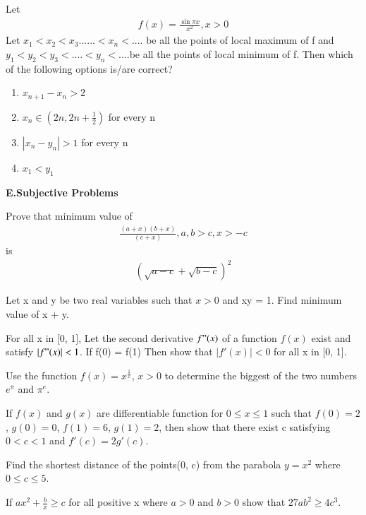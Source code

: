 \item Let 
\begin{align*}
f(x) = \frac{\sin \pi x}{x^2}, x > 0
\end{align*}
Let $x_1 < x_2 < x_3...... < x_n < $.... be all the points of local maximum of f and $y_1 < y_2 < y_3 < $....$ < y_n <$....be all the points of local minimum of f. Then which of the following options is/are correct?
\begin{enumerate}
\item $x_{n + 1} - x_n > 2$
\item $x_n \in (2n, 2n + \frac{1}{2})$ for every n
\item $|x_n - y_n| > 1$ for every n
\item $x_1 < y_1$
\end{enumerate}

\textbf{E.Subjective Problems}

\item Prove that minimum value of
\begin{align*} 
\frac{(a + x)(b + x)}{(c + x)}, a, b > c, x > -c
\end{align*} 
is
\begin{align*} 
(\sqrt{a - c} + \sqrt{b - c})^2
\end{align*}
 
\item Let x and y be two real variables such that $x > 0$ and xy = 1. Find minimum value of x + y.

\item For all x in [0, 1], Let the second derivative $f"(x)$ of a function $f(x)$ exist and satisfy $|f"(x)| < 1$. If f(0) = f(1) Then show that $|f'(x)|<0$ for all x in [0, 1].

\item Use the function $f(x) = x^\frac{1}{x}$, $x > 0$ to determine the biggest of the two numbers $e^{\pi}$ and $\pi^e$.

\item If $f(x)$ and $g(x)$ are differentiable function for $0 \leq x \leq 1$ such that $f(0)=2$, $g(0) = 0$, $f(1) = 6$, $g(1) = 2$, then show that there exist c satisfying $0 < c < 1$ and $f'(c) = 2g'(c)$.

\item Find the shortest distance of the points(0, c) from the parabola $y = x^2$ where $0 \leq c \leq 5$.

\item If $ax^2 + \frac{b}{x} \geq c$ for all positive x where $a > 0$ and $b > 0$ show that $27ab^2 \geq 4c^3$.

